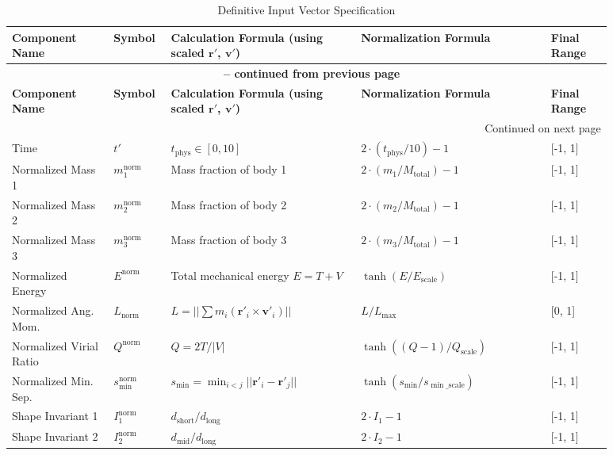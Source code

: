 \documentclass[11pt, a4paper]{article}
\begin{document}
\renewcommand{\arraystretch}{1.2}
\begin{longtable}{p{0.15\linewidth} p{0.06\linewidth} p{0.29\linewidth} p{0.29\linewidth} p{0.09\linewidth}}
\caption{Definitive Input Vector Specification} \label{tab:input_vector} \\
\toprule
\textbf{Component Name} & \textbf{Symbol} & \textbf{Calculation Formula (using scaled $\mathbf{r}'$, $\mathbf{v}'$)} & \textbf{Normalization Formula} & \textbf{Final Range} \\
\midrule
\endfirsthead
\multicolumn{5}{c}{{\bfseries \tablename\ \thetable{} -- continued from previous page}} \\
\toprule
\textbf{Component Name} & \textbf{Symbol} & \textbf{Calculation Formula (using scaled $\mathbf{r}'$, $\mathbf{v}'$)} & \textbf{Normalization Formula} & \textbf{Final Range} \\
\midrule
\endhead
\midrule \multicolumn{5}{r}{{Continued on next page}} \\ \bottomrule
\endfoot
\bottomrule
\endlastfoot
Time & $t'$ & $t_{\text{phys}} \in [0, 10]$ & $2 \cdot (t_{\text{phys}} / 10) - 1$ & [-1, 1] \\
Normalized Mass 1 & $m_1^{\text{norm}}$ & Mass fraction of body 1 & $2 \cdot (m_1 / M_{\text{total}}) - 1$ & [-1, 1] \\
Normalized Mass 2 & $m_2^{\text{norm}}$ & Mass fraction of body 2 & $2 \cdot (m_2 / M_{\text{total}}) - 1$ & [-1, 1] \\
Normalized Mass 3 & $m_3^{\text{norm}}$ & Mass fraction of body 3 & $2 \cdot (m_3 / M_{\text{total}}) - 1$ & [-1, 1] \\
Normalized Energy & $E^{\text{norm}}$ & Total mechanical energy $E=T+V$ & $\tanh(E/E_{\text{scale}})$ & [-1, 1] \\
Normalized Ang. Mom. & $L_{\text{norm}}$ & $L = ||\sum m_i (\mathbf{r}'_i \times \mathbf{v}'_i)||$ & $L / L_{\max}$ & [0, 1] \\
Normalized Virial Ratio & $Q^{\text{norm}}$ & $Q = 2T / |V|$ & $\tanh((Q - 1) / Q_{\text{scale}})$ & [-1, 1] \\
Normalized Min. Sep. & $s_{\min}^{\text{norm}}$ & $s_{\min} = \min_{i<j} ||\mathbf{r}'_i - \mathbf{r}'_j||$ & $\tanh(s_{\min} / s_{\min\_\text{scale}})$ & [-1, 1] \\
Shape Invariant 1 & $I_1^{\text{norm}}$ & $d_{\text{short}} / d_{\text{long}}$ & $2 \cdot I_1 - 1$ & [-1, 1] \\
Shape Invariant 2 & $I_2^{\text{norm}}$ & $d_{\text{mid}} / d_{\text{long}}$ & $2 \cdot I_2 - 1$ & [-1, 1] \\

\end{longtable}
\end{document}
